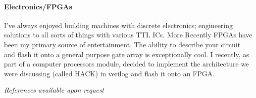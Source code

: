 \documentclass[9pt,a4paper]{article}
\begin{document}
\begin{multicols*}{2}
\paragraph{Electronics/FPGAs} I've always enjoyed building machines with discrete electronics;
engineering solutions to all sorts of things with various TTL ICs.
More Recently FPGAs have been my primary source of entertainment.
The ability to describe your circuit and flash it onto a general purpose gate array is exceptionally cool.
I recently, as part of a computer processors module, decided to implement the architecture we were discussing (called HACK) in verilog and flash it onto an FPGA.

\iffalse
\section*{Some Language/Software Skills}
\begin{multicols*}{2}
\begin{itemize}
\item C/C++
\item JavaScript
\item HTML5/CSS3
\item PHP
\item SQL
\item Python
\item Golang
\item Verilog
\item \LaTeX 
\item Git
\item Linux
\item BASH scripting
\item MS Office
\end{itemize}
\end{multicols*}
\fi
\vfill
\textit{References available upon request}
\end{multicols*}
\end{document}
